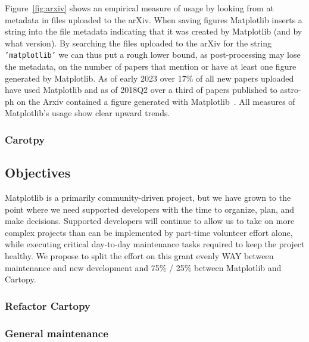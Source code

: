 \documentclass[12pt]{article}
\numberwithin{page}{section}
\begin{document}
Figure~\ref{fig:arxiv} shows an empirical measure of usage by looking from at
metadata in files uploaded to the arXiv.  When saving figures Matplotlib
inserts a string into the file metadata indicating that it was created by
Matplotlib (and by what version).  By searching the files uploaded to the arXiv
for the string \texttt{'matplotlib'} we can thus put a rough lower bound, as
post-processing may lose the metadata, on the number of papers that mention or
have at least one figure generated by Matplotlib.  As of early 2023 over 17\%
of all new papers uploaded have used Matplotlib and as of 2018Q2 over a third
of papers published to astro-ph on the Arxiv contained a figure generated with
Matplotlib~\cite{arxvi_stats}.  All measures of Matplotlib's usage show clear upward
trends.

\subsubsection{Carotpy}


\subsection{Objectives}


Matplotlib is a primarily community-driven project, but we have grown to the
point where we need supported developers with the time to organize, plan, and
make decisions.  Supported developers will continue to allow us to take on more
complex projects than can be implemented by part-time volunteer effort alone,
while executing critical day-to-day maintenance tasks required to keep the
project healthy.  We propose to split the effort on this grant evenly WAY
between maintenance and new development and 75\% / 25\% between Matplotlib and
Cartopy.


\subsubsection{Refactor Cartopy}

\subsubsection{General maintenance}
\end{document}

